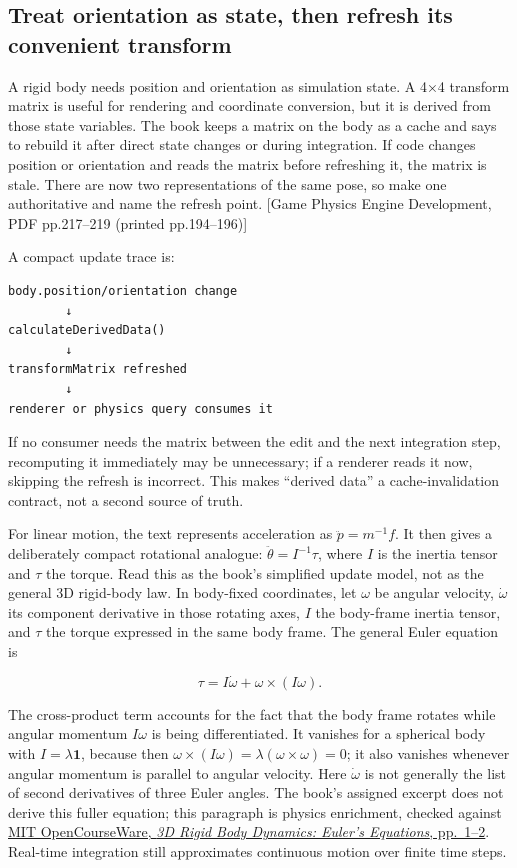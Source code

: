 \subsection{Treat orientation as state, then refresh its convenient transform}\label{06-engine-ii-ch033-treat-orientation-as-state-then-refresh-its-convenient-transform}

A rigid body needs position and orientation as simulation state. A 4×4 transform matrix is useful for rendering and coordinate conversion, but it is derived from those state variables. The book keeps a matrix on the body as a cache and says to rebuild it after direct state changes or during integration. If code changes position or orientation and reads the matrix before refreshing it, the matrix is stale. There are now two representations of the same pose, so make one authoritative and name the refresh point. {[}Game Physics Engine Development, PDF pp.217--219 (printed pp.194--196){]}

A compact update trace is:

\begin{verbatim}
body.position/orientation change
        ↓
calculateDerivedData()
        ↓
transformMatrix refreshed
        ↓
renderer or physics query consumes it
\end{verbatim}

If no consumer needs the matrix between the edit and the next integration step, recomputing it immediately may be unnecessary; if a renderer reads it now, skipping the refresh is incorrect. This makes ``derived data'' a cache-invalidation contract, not a second source of truth.

For linear motion, the text represents acceleration as \(\ddot{p}=m^{-1}f\). It then gives a deliberately compact rotational analogue: \(\ddot{\theta}=I^{-1}\tau\), where \(I\) is the inertia tensor and \(\tau\) the torque. Read this as the book's simplified update model, not as the general 3D rigid-body law. In body-fixed coordinates, let \(\omega\) be angular velocity, \(\dot{\omega}\) its component derivative in those rotating axes, \(I\) the body-frame inertia tensor, and \(\tau\) the torque expressed in the same body frame. The general Euler equation is

\[
\tau=I\dot{\omega}+\omega\times(I\omega).
\]

The cross-product term accounts for the fact that the body frame rotates while angular momentum \(I\omega\) is being differentiated. It vanishes for a spherical body with \(I=\lambda\mathbf{1}\), because then \(\omega\times(I\omega)=\lambda(\omega\times\omega)=0\); it also vanishes whenever angular momentum is parallel to angular velocity. Here \(\dot{\omega}\) is not generally the list of second derivatives of three Euler angles. The book's assigned excerpt does not derive this fuller equation; this paragraph is physics enrichment, checked against \href{https://ocw.mit.edu/courses/16-07-dynamics-fall-2009/5e1d8699338146e5127080b880b906d6_MIT16_07F09_Lec28.pdf}{MIT OpenCourseWare, \emph{3D Rigid Body Dynamics: Euler's Equations}, pp.~1--2}. Real-time integration still approximates continuous motion over finite time steps.

